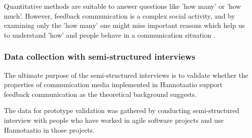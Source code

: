 \documentclass[english,12pt,a4paper,pdftex]{article}
\begin{document}
Quantitative methods are suitable to answer questions like 'how many' or 'how much'. However, feedback communication is a complex social activity, and by examining only the 'how many' one might miss important reasons which help us to understand 'how' and people behave in a communication situation \citep{silverman2009}.

\subsubsection{Data collection with semi-structured interviews}

The ultimate purpose of the semi-structured interviews is to validate whether the properties of communication media implemented in Hannotaatio support feedback communication as the theoretical background suggests. 

The data for prototype validation was gathered by conducting semi-structured interview with people who have worked in agile software projects and use Hannotaatio in those projects.
\end{document}
